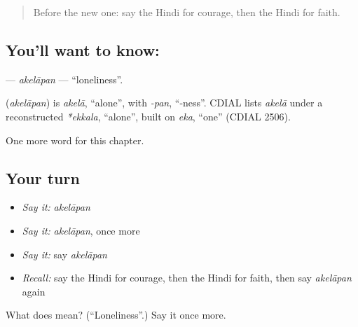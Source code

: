 \label{lesson:HI-C258-akelapan}



\begin{quote}
Before the new one: say the Hindi for courage, then the Hindi for faith.
\end{quote}

\subsection*{You'll want to know: }
\textbf{} — \emph{akelāpan} — \textquotedblleft{}loneliness\textquotedblright{}.

\begin{cousinweb}
\textbf{} (\emph{akelāpan}) is \emph{akelā}, \textquotedblleft{}alone\textquotedblright{}, with \emph{-pan}, \textquotedblleft{}-ness\textquotedblright{}. CDIAL lists \emph{akelā} under a reconstructed \emph{*ekkala}, \textquotedblleft{}alone\textquotedblright{}, built on \emph{eka}, \textquotedblleft{}one\textquotedblright{} (CDIAL 2506).
\end{cousinweb}

\begin{grammarlens}[title={What you've built}]
One more word for this chapter.
\end{grammarlens}

\subsection*{Your turn}
\begin{itemize}
\raggedright
  \item \emph{Say it:} \emph{akelāpan}
  \item \emph{Say it:} \emph{akelāpan}, once more
  \item \emph{Say it:} say \emph{akelāpan}
  \item \emph{Recall:} say the Hindi for courage, then the Hindi for faith, then say \emph{akelāpan} again
\end{itemize}

\begin{tcolorbox}[breakable,colback=teal!4,colframe=teal!35!black,title={Before you move on}]
What does  mean? (\textquotedblleft{}Loneliness\textquotedblright{}.) Say it once more.
\end{tcolorbox}
